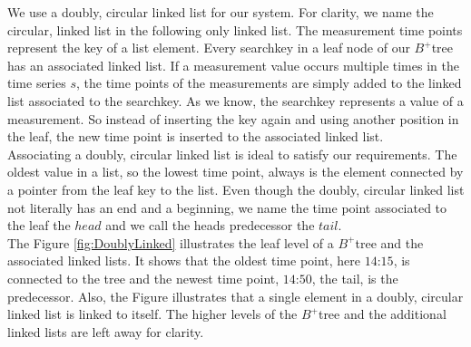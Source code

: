\documentclass[abstracton,12pt,oneside]{scrreprt}
\begin{document}
We use a doubly, circular linked list for our system. For clarity, we name the circular, linked list in the following only linked list. The measurement time points represent the key of a list element. Every searchkey in a leaf node of our $B^+$tree has an associated linked list. If a measurement value occurs multiple times in the time series $s$, the time points of the measurements are simply added to the linked list associated to the searchkey. As we know, the searchkey represents a value of a measurement. So instead of inserting the key again and using another position in the leaf, the new time point is inserted to the associated linked list.\\ 
Associating a doubly, circular linked list is ideal to satisfy our requirements. The oldest value in a list, so the lowest time point, always is the element connected by a pointer from the leaf key to the list. Even though the doubly, circular linked list not literally has an end and a beginning, we name the time point associated to the leaf the $head$ and we call the heads predecessor the $tail$. \\The Figure \ref{fig:DoublyLinked} illustrates the leaf level of a $B^+$tree and the associated linked lists. It shows that the oldest time point, here $\text{14:15}$, is connected to the tree and the newest time point, $\text{14:50}$, the tail, is the predecessor. Also, the Figure illustrates that a single element in a doubly, circular linked list is linked to itself. The higher levels of the $B^+$tree and the additional linked lists are left away for clarity. 
\end{document}

